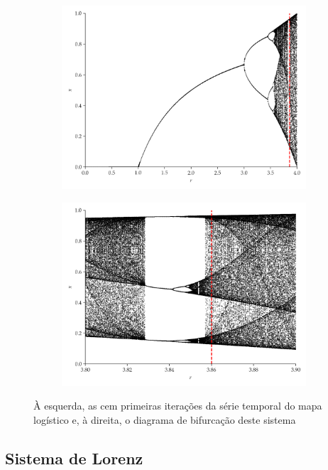 \documentclass[aspectratio=169]{beamer}
\begin{document}
\begin{frame}
\begin{figure}[H]
\begin{subfigure}[t]{0.3\textwidth}
         \includegraphics[scale=0.2]{mapa-logistico.png}
     \end{subfigure}
     \begin{subfigure}[t]{0.3\textwidth} 
         \includegraphics[scale=0.2]{mapa-logistico-zoom.png}
     \end{subfigure}     
     \caption{À esquerda, as cem primeiras iterações da série temporal do mapa logístico e, à direita, o diagrama de bifurcação deste sistema}
     \label{fig:logistic}
\end{figure}
\end{frame}

\subsection{Sistema de Lorenz}
\end{document}
